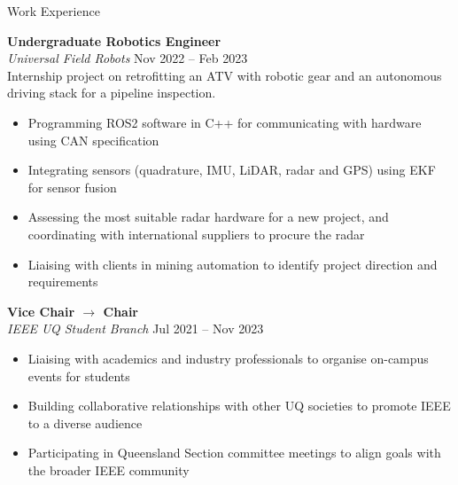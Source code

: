 \documentclass{custom-resume}
\begin{document}
\begin{minipage}[t][23cm]{\rightouterwidth}
\begin{section*}{Work Experience}
    \vspace{8pt}

    \textbf{Undergraduate Robotics Engineer} \\[8pt]

    \textit{Universal Field Robots} \hfill Nov 2022 -- Feb 2023\\[8pt]

    Internship project on retrofitting an ATV with robotic gear and an autonomous driving stack for a pipeline inspection.

    \begin{itemize}
      \item Programming ROS2 software in C++ for communicating with hardware using CAN specification
      \item Integrating sensors (quadrature, IMU, LiDAR, radar and GPS) using EKF for sensor fusion
      \item Assessing the most suitable radar hardware for a new project, and coordinating with international suppliers to procure the radar
      \item Liaising with clients in mining automation to identify project direction and requirements
    \end{itemize}

    \vspace{8pt}

    \textbf{Vice Chair $\rightarrow$ Chair} \\[8pt]

    \textit{IEEE UQ Student Branch} \hfill Jul 2021 -- Nov 2023

    \begin{itemize}
      \item Liaising with academics and industry professionals to organise on-campus events for students
      \item Building collaborative relationships with other UQ societies to promote IEEE to a diverse audience
      \item Participating in Queensland Section committee meetings to align goals with the broader IEEE community
    \end{itemize}

  \end{section*}

\end{minipage}

\FooterRule
\newpage

\end{document}
